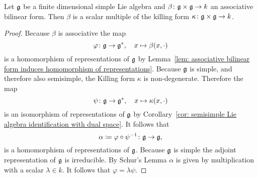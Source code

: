 \begin{corollary}
 Let $\mathfrak{g}$ be a finite dimensional simple Lie algebra and $\beta \colon \mathfrak{g} \times \mathfrak{g} \to k$ an associative bilinear form. Then $\beta$ is a scalar multiple of the killing form $\kappa \colon \mathfrak{g} \times \mathfrak{g} \to k$.
\end{corollary}
\begin{proof}
 Because $\beta$ is associative the map
 \[
  \varphi \colon \mathfrak{g} \to \mathfrak{g}^*, \quad x \mapsto \beta(x, \cdot)
 \]
 is a homomorphism of representations of $\mathfrak{g}$ by Lemma~\ref{lem: associative bilinear form induces homomorphism of representations}. Because $\mathfrak{g}$ is simple, and therefore also semisimple, the Killing form $\kappa$ is non-degenerate. Therefore the map
 \[
  \psi \colon \mathfrak{g} \to \mathfrak{g}^*, \quad x \mapsto \kappa(x, \cdot)
 \]
 is an isomorphism of representations of $\mathfrak{g}$ by Corollary~\ref{cor: semisimple Lie algebra identification with dual space}. It follows that
 \[
  \alpha \coloneqq \varphi \circ \psi^{-1} \colon \mathfrak{g} \to \mathfrak{g}, 
 \]
 is a homomorphism of representations of $\mathfrak{g}$. Because $\mathfrak{g}$ is simple the adjoint representation of $\mathfrak{g}$ is irreducible. By Schur’s Lemma $\alpha$ is given by multiplication with a scalar $\lambda \in k$. It follows that $\varphi = \lambda \psi$.
\end{proof}














